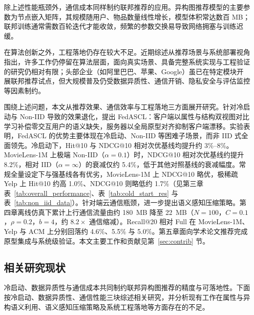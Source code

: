 除上述性能瓶颈外，通信成本同样制约联邦推荐的应用。异构图推荐模型的主要参数为节点嵌入矩阵，其规模随用户、物品数量线性增长，模型体积常达数百 MB\cite{jiang2022fedmp, khan2025hufe}；联邦训练通常需数百轮迭代才能收敛\cite{reisizadeh2020fedpaq}，频繁的参数交换易导致网络拥塞与训练迟缓。

在算法创新之外，工程落地仍存在较大不足。近期综述从推荐场景与系统部署视角指出，许多工作仍停留在算法层面，面向真实场景、具备完整系统实现与工程验证的研究仍相对有限\cite{mi2025fedrecsurvey}；头部企业（如阿里巴巴、苹果、Google）虽已在特定模块开展联邦推荐试点，但大规模普及仍受数据异质性、通信开销、隐私安全与评估监控等因素制约。

围绕上述问题，本文从推荐效果、通信效率与工程落地三方面展开研究。针对冷启动与 Non-IID 导致的效果退化，提出 FedASCL：客户端以属性与结构双视图对比学习补偿零交互用户的语义缺失，服务器以全局原型对齐抑制客户端漂移。实验表明，FedASCL 的优势主要体现在冷启动、Non-IID 等困难子场景，而非 IID 式全面领先。冷启动下，Hit@10 与 NDCG@10 相对次优基线均提升约 3\%--8\%。MovieLens-1M 上极端 Non-IID（$\alpha=0.1$）时，NDCG@10 相对次优基线约提升 8.2\%，相对 IID（$\alpha=\infty$）的衰减仅约 5.4\%，低于其他对照基线的衰减幅度。常规全量设定下与强基线各有优劣，MovieLens-1M 上 NDCG@10 略优，极稀疏 Yelp 上 Hit@10 约高 1.0\%、NDCG@10 则略低约 1.7\%（见第三章表~\ref{tab:overall_performance}、表~\ref{tab:cold_start_res} 与表~\ref{tab:non_iid_data}）。针对端云通信瓶颈，进一步提出语义感知压缩策略。第四章离线仿真下累计上行通信流量由约 180~MB 降至 22~MB（$N{=}100$，$C{=}0.1$，$\rho{=}0.2$，$b{=}4$，约 $8.2\times$ 通信缩减）。Recall@20 相对 Full 在 MovieLens-1M、Yelp 与 ACM 上分别回落约 4.6\%、5.5\% 与 5.0\%。第五章面向学术论文推荐完成原型集成与系统级验证。本文主要工作和贡献见第~\ref{sec:contrib} 节。

\subsection{相关研究现状}

冷启动、数据异质性与通信成本共同制约联邦异构图推荐的精度与可落地性。下面按冷启动、数据异质性、通信性能三块综述相关研究，并分析现有工作在属性与异构语义利用、语义感知压缩策略及系统工程落地等方面存在的不足。

